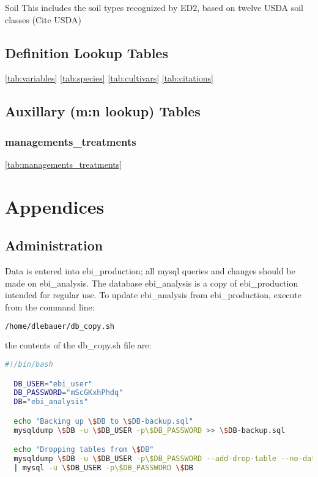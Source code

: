 \begin{enumerate}
\par{Soil}
This includes the soil types recognized by ED2, based on twelve USDA soil classes (Cite USDA)

\section{Definition Lookup Tables}
\ref{tab:variables}
\ref{tab:species}
\ref{tab:cultivars}
\ref{tab:citations}

\section{Auxillary (m:n lookup) Tables}

\subsection{managements\_treatments}\ref{tab:managements_treatments}


\chapter{Appendices}

\listoftodos

\section{Administration}
Data is entered into ebi\_production; all mysql queries and changes should be made on ebi\_analysis. 
The database ebi\_analysis is a copy of ebi\_production intended for regular use. 
To update ebi\_analysis from ebi\_production, execute from the command line:

\begin{lstlisting}[language=bash]
  /home/dlebauer/db_copy.sh
\end{lstlisting}

the contents of the db\_copy.sh file are:
\begin{lstlisting}[language=bash]
  #!/bin/bash

  DB_USER="ebi_user"
  DB_PASSWORD="mScGKxhPhdq"
  DB="ebi_analysis"

  echo "Backing up \$DB to \$DB-backup.sql"
  mysqldump \$DB -u \$DB_USER -p\$DB_PASSWORD >> \$DB-backup.sql

  echo "Dropping tables from \$DB"
  mysqldump \$DB -u \$DB_USER -p\$DB_PASSWORD --add-drop-table --no-data | grep ^DROP
  | mysql -u \$DB_USER -p\$DB_PASSWORD \$DB


\end{lstlisting}
\end{enumerate}
